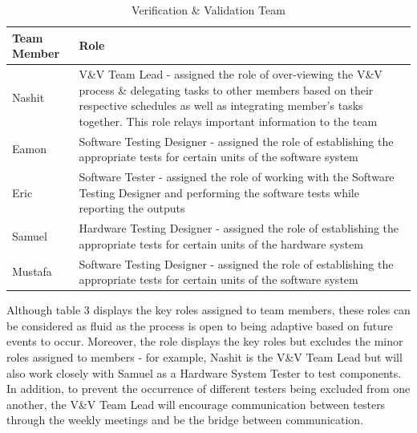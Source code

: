 \documentclass[12pt, titlepage]{article}
\begin{document}
\begin{center}
\begin{table}[H]
    \centering
    \begin{tabular}{|p{4cm}|p{9cm}|}
        \hline
        Team Member &  Role\\
        \hline
        Nashit & V\&V Team Lead - assigned the role of over-viewing the V\&V process \& delegating tasks to other members based on their respective schedules as well as integrating member’s tasks together. This role relays important information to the team\\
        \hline
        Eamon & Software Testing Designer - assigned the role of establishing the appropriate tests for certain units of the software system\\
        \hline
        Eric & Software Tester - assigned the role of working with the Software Testing Designer and performing the software tests while reporting the outputs\\
        \hline
        Samuel & Hardware Testing Designer - assigned the role of establishing the appropriate tests for certain units of the hardware system\\
        \hline
        Mustafa & Software Testing Designer - assigned the role of establishing the appropriate tests for certain units of the software system\\
        \hline
    \end{tabular}
    \caption{Verification \& Validation Team}
    \label{tab:my_label}
\end{table}
\end{center}
Although table 3 displays the key roles assigned to team members, these roles can be considered as fluid as the process is open to being adaptive based on future events to occur. Moreover, the role displays the key roles but excludes the minor roles assigned to members - for example, Nashit is the V\&V Team Lead but will also work closely with Samuel as a Hardware System Tester to test components. In addition, to prevent the occurrence of different testers being excluded from one another, the V\&V Team Lead will encourage communication between testers through the weekly meetings and be the bridge between communication.
\end{document}
